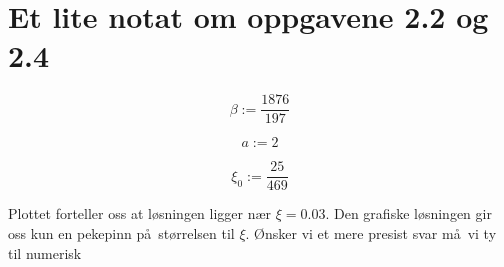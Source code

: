 \documentclass{article}
\begin{document}
\section*{Et lite notat om  oppgavene 2.2 og 2.4}


\begin{maplegroup}
\begin{mapleinput}
\end{mapleinput}

\mapleresult
\begin{maplelatex}
\[
\beta  := {\displaystyle \frac {1876}{197}} 
\]
\end{maplelatex}

\end{maplegroup}
\begin{maplegroup}
\begin{mapleinput}
\end{mapleinput}

\mapleresult
\begin{maplelatex}
\[
a := 2
\]
\end{maplelatex}

\end{maplegroup}
\begin{maplegroup}
\begin{mapleinput}
\end{mapleinput}

\mapleresult
\begin{maplelatex}
\[
\mathit{\xi_0} := {\displaystyle \frac {25}{469}} 
\]
\end{maplelatex}

\end{maplegroup}
\begin{maplegroup}
\begin{mapleinput}
\end{mapleinput}

\mapleresult
\begin{center}
\end{center}

\end{maplegroup}
Plottet forteller oss at l\o sningen ligger n\ae r $\xi=0.03$.
Den grafiske l\o sningen gir oss kun en pekepinn p\aa\ st\o rrelsen
til $\xi$. \O nsker vi et mere presist svar m\aa\ vi ty til numerisk
\end{document}

